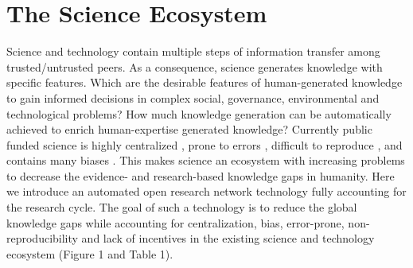 \documentclass[10pt, a4paper, twocolumn]{article} %
\begin{document}
{ 
\section{The Science Ecosystem}
Science and technology contain multiple steps of information transfer
among trusted/untrusted peers. As a consequence, science generates
knowledge with specific features. Which are the desirable features of
human-generated knowledge to gain informed decisions in complex
social, governance, environmental and technological problems? How much
knowledge generation can be automatically achieved to enrich
human-expertise generated knowledge? Currently public funded science
is highly centralized \citep{Inhaber1977,Gunther2018}⁠⁠, prone to errors
\citep{Fang2011}, difficult to reproduce \citep{Hardwicke2018}, and
contains many biases \citep{Ioannidis2005}. This makes science an
ecosystem with increasing problems to decrease the evidence- and
research-based knowledge gaps in humanity. Here we introduce an
automated open research network technology fully accounting for the
research cycle. The goal of such a technology is to reduce the global
knowledge gaps while accounting for centralization, bias, error-prone,
non-reproducibility and lack of incentives in the existing science and
technology ecosystem (Figure 1 and Table 1).

}
\end{document}
